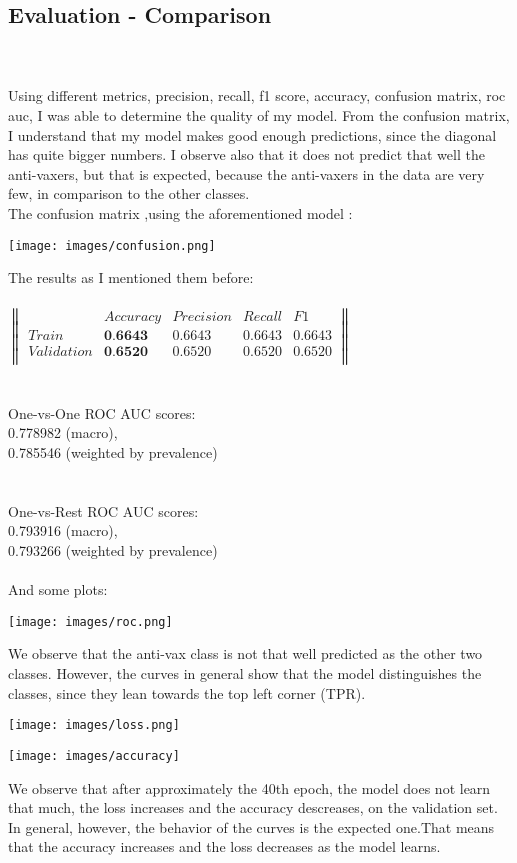 \documentclass{article}
\begin{document}
\subsection{Evaluation - Comparison}
\\ \\
Using different metrics, precision, recall, f1 score, accuracy, confusion matrix, roc auc, I was able to determine the quality of my model. From the confusion matrix, I understand that my model makes good enough predictions, since the diagonal has quite bigger numbers. I observe also that it does not predict that well the anti-vaxers, but that is expected, because the anti-vaxers in the data are very few, in comparison to the other classes. \\The confusion matrix ,using the aforementioned model :
\begin{center}
\texttt{[image: images/confusion.png]}
\end{center}
The results as I mentioned them before: \\ \\
$
\begin{Vmatrix}
& Accuracy & Precision &  Recall & F1\\
Train & \textbf{0.6643} & 0.6643 & 0.6643 & 0.6643\\
Validation & \textbf{0.6520} & 0.6520 & 0.6520 & 0.6520\\
\end{Vmatrix} 
$ \\ \\ \\
One-vs-One ROC AUC scores: \\
0.778982 (macro), \\
0.785546 (weighted by prevalence) \\
\\ \\
One-vs-Rest ROC AUC scores: \\
0.793916 (macro), \\
0.793266 (weighted by prevalence) \\ \\
And some plots:
\begin{center}
\texttt{[image: images/roc.png]}
\end{center}
We observe that the anti-vax class is not that well predicted as the other two classes.
However, the curves in general show that the model distinguishes the classes, since they lean towards the top left corner (TPR).
\begin{center}
\texttt{[image: images/loss.png]}
\end{center}
\begin{center}
\texttt{[image: images/accuracy]}
\end{center}
We observe that after approximately the 40th epoch, the model does not learn that much, the loss increases and the accuracy descreases, on the validation set.
In general, however, the behavior of the curves is the expected one.That means that the accuracy increases and the loss decreases as the model learns.
\end{document}
